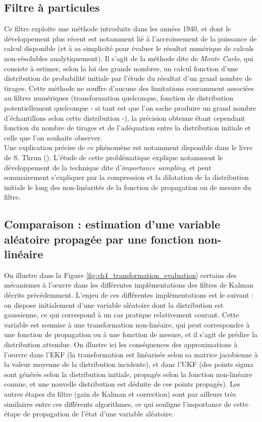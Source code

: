 \subsection{Filtre à particules} \label{sec:ch4_filtre_particule}
Ce filtre exploite une méthode introduite dans les années 1940, et dont le développement plus récent est notamment lié à l'accroissement de la puissance de calcul disponible (et à sa simplicité pour évaluer le résultat numérique de calculs non-résolubles analytiquement). Il s'agit de la méthode dite de \emph{Monte Carlo}, qui consiste à estimer, selon la loi des grands nombres, un calcul fonction d'une distribution de probabilité initiale par l'étude du résultat d'un grand nombre de tirages. Cette méthode ne souffre d'aucune des limitations couramment associées au filtres numériques (transformation quelconque, fonction de distribution potentiellement quelconque - si tant est que l'on sache produire un grand nombre d'échantillons selon cette distribution -), la précision obtenue étant cependant fonction du nombre de tirages et de l'adéquation entre la distribution initiale et celle que l'on souhaite observer.\\
Une explication précise de ce phénomène est notamment disponible dans le livre de S. Thrun (\cite{Thrun2005}). L'étude de cette problématique explique notamment le développement de la technique dite d'\emph{importance sampling}, et peut sommairement s'expliquer par la compression et la dilatation de la distribution initiale le long des non-linéarités de la fonction de propagation ou de mesure du filtre.

\subsection{Comparaison : estimation d'une variable aléatoire propagée par une fonction non-linéaire}
On illustre dans la Figure \ref{fig:ch4_transformation_evaluation} certains des mécanismes à l’œuvre dans les différentes implémentations des filtres de Kalman décrits précédemment. L'enjeu de ces différentes implémentations est le suivant : on dispose initialement d'une variable aléatoire dont la distribution est gaussienne, ce qui correspond à un cas pratique relativement courant. Cette variable est soumise à une transformation non-linéaire, qui peut correspondre à une fonction de propagation ou à une fonction de mesure, et il s'agit de prédire la distribution attendue. On illustre ici les conséquences des approximations à l’œuvre dans l'EKF (la transformation est linéarisée selon sa matrice jacobienne à la valeur moyenne de la distribution incidente), et dans l'UKF (des points sigma sont générés selon la distribution initiale, propagés selon la fonction non-linéaire connue, et une nouvelle distribution est déduite de ces points propagés). Les autres étapes du filtre (gain de Kalman et correction) sont par ailleurs très similaires entre ces différents algorithmes, ce qui souligne l'importance de cette étape de propagation de l'état d'une variable aléatoire.\\

